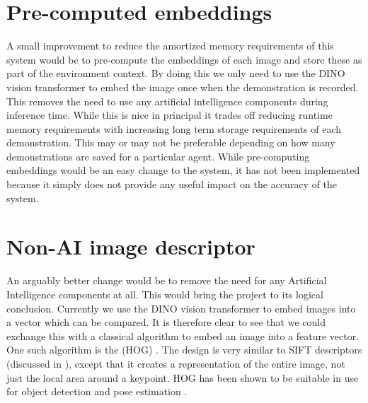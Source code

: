 \section{Pre-computed embeddings}
A small improvement to reduce the amortized memory requirements of this system would be to pre-compute the embeddings of each image and store these as part of the environment context. By doing this we only need to use the DINO vision transformer \cite{dino-paper} to embed the image once when the demonstration is recorded. This removes the need to use any artificial intelligence components during inference time. While this is nice in principal it trades off reducing runtime memory requirements with increasing long term storage requirements of each demonstration. This may or may not be preferable depending on how many demonstrations are saved for a particular agent. While pre-computing embeddings would be an easy change to the system, it has not been implemented because it simply does not provide any useful impact on the accuracy of the system.

\section{Non-AI image descriptor}
An arguably better change would be to remove the need for any Artificial Intelligence components at all. This would bring the project to its logical conclusion. Currently we use the DINO vision transformer \cite{dino-paper} to embed images into a vector which can be compared. It is therefore clear to see that we could exchange this with a classical algorithm to embed an image into a feature vector. One such algorithm is the  (HOG) \cite{hog-patent}. The design is very similar to SIFT descriptors (discussed in ), except that it creates a representation of the entire image, not just the local area around a keypoint. HOG has been shown to be suitable in use for object detection \cite{hog-object} and pose estimation \cite{hog-hand}.\\

